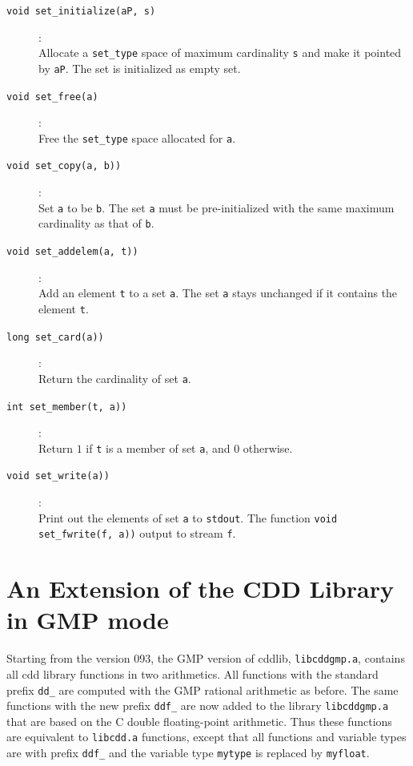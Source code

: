\documentclass[11pt]{article}
\newcommand {\0} {{\bf 0}}
\begin{document}
\begin{description}

\item[{\tt void set\_initialize(aP, s)}]:\\
Allocate a {\tt set\_type} space of maximum cardinality {\tt s}
 and make it pointed by {\tt aP}.  The set is initialized as empty set.

\item[{\tt void set\_free(a)}]:\\
Free the  {\tt set\_type} space allocated for {\tt a}.

\item[{\tt void set\_copy(a, b))}]:\\
Set {\tt a} to be {\tt b}.   The set {\tt a} must be pre-initialized
with the same maximum cardinality as that of {\tt b}.

\item[{\tt void set\_addelem(a, t))}]:\\
Add an element  {\tt t} to a set {\tt a}.    The set  {\tt a} stays unchanged
if it contains the element {\tt t}.

\item[{\tt long set\_card(a))}]:\\
Return the cardinality of set {\tt a}.

\item[{\tt int set\_member(t, a))}]:\\
Return $1$ if  {\tt t} is a member of set {\tt a}, and $0$ otherwise.


\item[{\tt void set\_write(a))}]:\\
Print out the elements of set {\tt a} to {\tt stdout}.  The function {\tt void set\_fwrite(f, a))} output
to stream {\tt f}.

\end{description}

\section{An Extension of the CDD Library in GMP mode}  \label{GMPLIB}

Starting from the version 093, the GMP version of cddlib, {\tt libcddgmp.a}, contains
all cdd library functions in two arithmetics.   All functions with the standard prefix {\tt dd\_}
are computed with the GMP rational arithmetic as before.  The same functions with
the new prefix {\tt ddf\_} are now added to the library  {\tt libcddgmp.a} that are based
on the C  double floating-point arithmetic.  Thus these functions are equivalent to
 {\tt libcdd.a} functions, except that all functions and  variable types are with prefix  {\tt ddf\_} and
the variable type {\tt mytype} is replaced by {\tt myfloat}.
\end{document}

